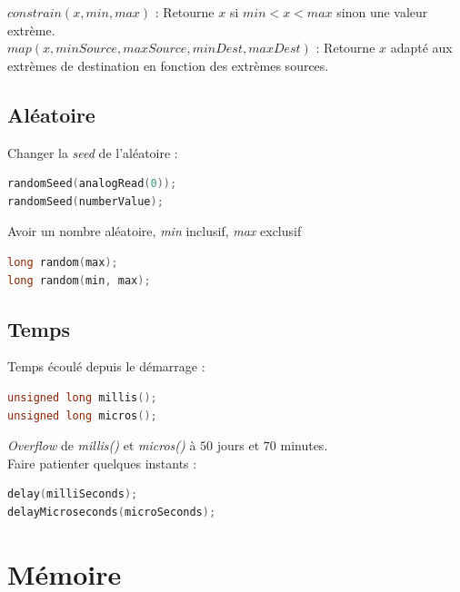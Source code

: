             $constrain(x, min, max)$ : Retourne $x$ si $min < x < max$ sinon une valeur extrème.\\
            $map(x, minSource, maxSource, minDest, maxDest)$ : Retourne $x$ adapté aux extrèmes de destination en fonction des extrèmes sources.

        \subsection{Aléatoire}
            Changer la \textit{seed} de l'aléatoire :
            \begin{lstlisting}[language=C]
randomSeed(analogRead(0));
randomSeed(numberValue);
            \end{lstlisting}

            Avoir un nombre aléatoire,
            \textit{min} inclusif, \textit{max} exclusif
            \begin{lstlisting}[language=C]
long random(max);
long random(min, max);
            \end{lstlisting}

        \subsection{Temps}
            Temps écoulé depuis le démarrage :
            \begin{lstlisting}[language=C]
unsigned long millis();
unsigned long micros();
            \end{lstlisting}
            \textit{Overflow} de \textit{millis()} et \textit{micros()} à $50$ jours et $70$ minutes.\\
            Faire patienter quelques instants :
            \begin{lstlisting}[language=C]
delay(milliSeconds);
delayMicroseconds(microSeconds);
            \end{lstlisting}


    \section{Mémoire}
